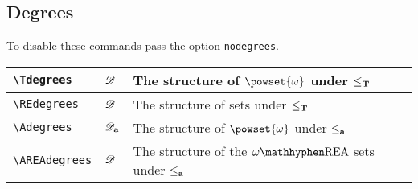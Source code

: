 \documentclass[leqno,11pt]{amsart}
\begin{document}
\subsection{Degrees}
To disable these commands pass the option \verb=nodegrees=. \\


\begin{xtabular}{l |  l | l}\toprule
  \verb=\Tdegrees=                                        & \( 	\mathscr{D}                              	   \)   & The structure of \( \powset{\omega} \) under \( \leq_{\mathbf{T}} \) \\ \midrule
  \verb=\REdegrees=                                        & \( 	\mathscr{D}                              	   \)   & The structure of \re sets under \( \leq_{\mathbf{T}} \) \\ \midrule
  \verb=\Adegrees=                                        & \( 	\mathscr{D}_{\mathbf{a}}                              	   \)   & The structure of \( \powset{\omega} \) under \( \leq_{\mathbf{a}} \) \\ \midrule
  \verb=\AREAdegrees=                                        & \( 	\mathscr{D}                              	   \)   & The structure of the \( \REA[\omega] \) sets under \( \leq_{\mathbf{a}} \) \\ \midrule


\end{xtabular}
\end{document}
